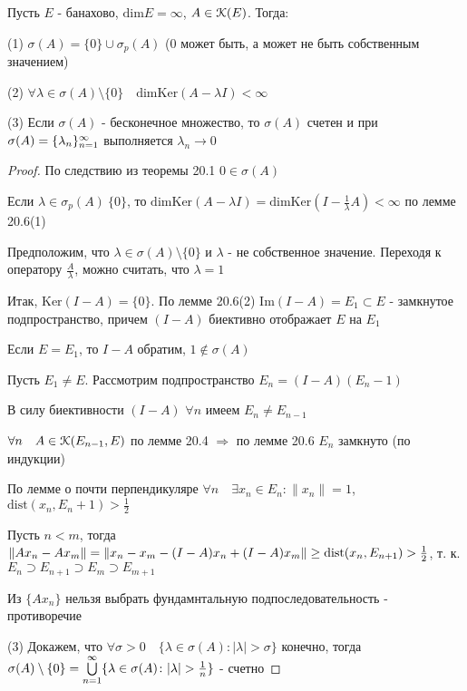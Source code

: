 \documentclass[a4paper,12pt]{report}
\newcommand*{\hm}[1]{#1\nobreak\discretionary{}%
            {\hbox{$\mathsurround=0pt #1$}}{}}
\begin{document}
\begin{thm}
Пусть $E$ - банахово, $\mathrm{dim}E=\infty$, $A\in\EuScript K(E)$. Тогда: 

(1) $\sigma(A)=\{0\}\cup\sigma_p(A)$ (0 может быть, а может не быть собственным значением)

(2) $\forall\lambda\in\sigma(A)\setminus\{0\}\quad\mathrm{dimKer}(A-\lambda I)<\infty$

(3) Если $\sigma(A)$ - бесконечное множество, то $\sigma(A)$ счетен и при $\sigma(A)\hm=\{\lambda_n\}_{n=1}^\infty$ выполняется $\lambda_n\to0$
\end{thm}
\begin{proof}
По следствию из теоремы 20.1 $0\in\sigma(A)$

Если $\lambda\in\sigma_p(A)\ \{0\}$, то $\mathrm{dimKer}(A-\lambda I)=\mathrm{dimKer}(I-\frac1\lambda A)<\infty$ по лемме 20.6(1)

Предположим, что $\lambda\in\sigma(A)\setminus\{0\}$ и $\lambda$ - не собственное значение. Переходя к оператору $\frac{A}\lambda$, можно считать, что $\lambda=1$\

Итак, $\mathrm{Ker}(I-A)=\{0\}$. По лемме 20.6(2) $\mathrm{Im}(I-A)=E_1\subset E$ - замкнутое подпространство, причем $(I-A)$ биективно отображает $E$ на $E_1$

Если $E=E_1$, то $I-A$ обратим, $1\notin\sigma(A)$

Пусть $E_1\ne E$. Рассмотрим подпространство $E_n=(I-A)(E_n-1)$

В силу биективности $(I-A)$ $\forall n$ имеем $E_n\ne E_{n-1}$

$\forall n\quad A\in\EuScript K(E_{n-1},E)$ по лемме 20.4 $\Rightarrow$ по лемме 20.6 $E_n$ замкнуто (по индукции)

По лемме о почти перпендикуляре $\forall n\quad\exists x_n\in E_n\colon\|x_n\|=1$, \\$\mathrm{dist}(x_n,E_n+1)>\frac12$

Пусть $n<m$, тогда $\|Ax_n-Ax_m\|=\|x_n-x_m-(I-A)x_n+(I-A)x_m\|\hm\ge\mathrm{dist}(x_n,E_{n+1})>\frac12$, т. к. $E_n\supset E_{n+1}\supset E_m\supset E_{m+1}$

Из $\{Ax_n\}$ нельзя выбрать фундамнтальную подпоследовательность - противоречие 

(3) Докажем, что $\forall\sigma>0\quad\{\lambda\in\sigma(A)\colon|\lambda|>\sigma\}$ конечно, тогда $\sigma(A)\setminus\{0\}\hm=\bigcup\limits_{n=1}^\infty\{\lambda\in\sigma(A)\colon|\lambda|>\frac1n\}$ - счетно


\end{proof}
\end{document}
